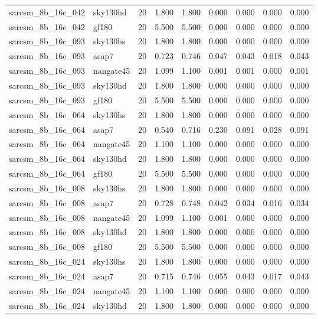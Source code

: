 \begin{tabular}{llrrrrrrr}
sarcsm\_8b\_16c\_042 & sky130hd & 20 & 1.800 & 1.800 & 0.000 & 0.000 & 0.000 & 0.000 \\
sarcsm\_8b\_16c\_042 & gf180 & 20 & 5.500 & 5.500 & 0.000 & 0.000 & 0.000 & 0.000 \\
sarcsm\_8b\_16c\_093 & sky130hs & 20 & 1.800 & 1.800 & 0.000 & 0.000 & 0.000 & 0.000 \\
sarcsm\_8b\_16c\_093 & asap7 & 20 & 0.723 & 0.746 & 0.047 & 0.043 & 0.018 & 0.043 \\
sarcsm\_8b\_16c\_093 & nangate45 & 20 & 1.099 & 1.100 & 0.001 & 0.001 & 0.000 & 0.001 \\
sarcsm\_8b\_16c\_093 & sky130hd & 20 & 1.800 & 1.800 & 0.000 & 0.000 & 0.000 & 0.000 \\
sarcsm\_8b\_16c\_093 & gf180 & 20 & 5.500 & 5.500 & 0.000 & 0.000 & 0.000 & 0.000 \\
sarcsm\_8b\_16c\_064 & sky130hs & 20 & 1.800 & 1.800 & 0.000 & 0.000 & 0.000 & 0.000 \\
sarcsm\_8b\_16c\_064 & asap7 & 20 & 0.540 & 0.716 & 0.230 & 0.091 & 0.028 & 0.091 \\
sarcsm\_8b\_16c\_064 & nangate45 & 20 & 1.100 & 1.100 & 0.000 & 0.000 & 0.000 & 0.000 \\
sarcsm\_8b\_16c\_064 & sky130hd & 20 & 1.800 & 1.800 & 0.000 & 0.000 & 0.000 & 0.000 \\
sarcsm\_8b\_16c\_064 & gf180 & 20 & 5.500 & 5.500 & 0.000 & 0.000 & 0.000 & 0.000 \\
sarcsm\_8b\_16c\_008 & sky130hs & 20 & 1.800 & 1.800 & 0.000 & 0.000 & 0.000 & 0.000 \\
sarcsm\_8b\_16c\_008 & asap7 & 20 & 0.728 & 0.748 & 0.042 & 0.034 & 0.016 & 0.034 \\
sarcsm\_8b\_16c\_008 & nangate45 & 20 & 1.099 & 1.100 & 0.001 & 0.000 & 0.000 & 0.000 \\
sarcsm\_8b\_16c\_008 & sky130hd & 20 & 1.800 & 1.800 & 0.000 & 0.000 & 0.000 & 0.000 \\
sarcsm\_8b\_16c\_008 & gf180 & 20 & 5.500 & 5.500 & 0.000 & 0.000 & 0.000 & 0.000 \\
sarcsm\_8b\_16c\_024 & sky130hs & 20 & 1.800 & 1.800 & 0.000 & 0.000 & 0.000 & 0.000 \\
sarcsm\_8b\_16c\_024 & asap7 & 20 & 0.715 & 0.746 & 0.055 & 0.043 & 0.017 & 0.043 \\
sarcsm\_8b\_16c\_024 & nangate45 & 20 & 1.100 & 1.100 & 0.000 & 0.000 & 0.000 & 0.000 \\
sarcsm\_8b\_16c\_024 & sky130hd & 20 & 1.800 & 1.800 & 0.000 & 0.000 & 0.000 & 0.000 \\

\end{tabular}
